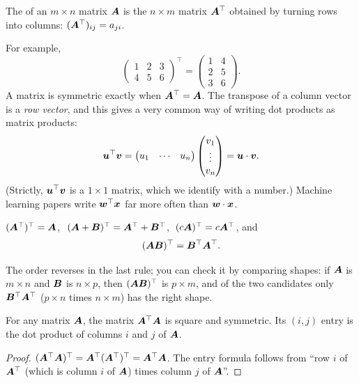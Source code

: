 \begin{definition}[Transpose]\label{def:transpose}
The  of an $m\times n$ matrix $\bm{A}$ is the $n\times m$ matrix
$\bm{A}^\top$ obtained by turning rows into columns: $(\bm{A}^\top)_{ij} = a_{ji}$.
\end{definition}

For example,
\[
  \begin{pmatrix} 1 & 2 & 3\\ 4 & 5 & 6\end{pmatrix}^{\!\top}
  = \begin{pmatrix} 1 & 4\\ 2 & 5\\ 3 & 6\end{pmatrix}.
\]
A matrix is symmetric exactly when $\bm{A}^\top = \bm{A}$. The transpose of a column
vector is a \emph{row vector}, and this gives a very common way of writing dot
products as matrix products:
\[
  \bm{u}^\top\bm{v} = \begin{pmatrix} u_1 & \cdots & u_n\end{pmatrix}
  \begin{pmatrix} v_1\\ \vdots\\ v_n\end{pmatrix} = \bm{u}\cdot\bm{v} .
\]
(Strictly, $\bm{u}^\top\bm{v}$ is a $1\times1$ matrix, which we identify with a
number.) Machine learning papers write $\bm{w}^\top\bm{x}$ far more often than
$\bm{w}\cdot\bm{x}$.

\begin{theorem}\label{thm:transpose-rules}
$(\bm{A}^\top)^\top = \bm{A}$, $\ (\bm{A} + \bm{B})^\top = \bm{A}^\top + \bm{B}^\top$,
$\ (c\bm{A})^\top = c\bm{A}^\top$, and
\[
  (\bm{A}\bm{B})^\top = \bm{B}^\top\bm{A}^\top .
\]
\end{theorem}

The order reverses in the last rule; you can check it by comparing shapes: if
$\bm{A}$ is $m\times n$ and $\bm{B}$ is $n\times p$, then $(\bm{A}\bm{B})^\top$ is
$p\times m$, and of the two candidates only $\bm{B}^\top\bm{A}^\top$ ($p\times n$
times $n\times m$) has the right shape.

\begin{proposition}\label{prop:ata-symmetric}
For any matrix $\bm{A}$, the matrix $\bm{A}^\top\bm{A}$ is square and symmetric. Its
$(i,j)$ entry is the dot product of columns $i$ and $j$ of $\bm{A}$.
\end{proposition}

\begin{proof}
$(\bm{A}^\top\bm{A})^\top = \bm{A}^\top(\bm{A}^\top)^\top = \bm{A}^\top\bm{A}$. The entry formula
follows from ``row $i$ of $\bm{A}^\top$ (which is column $i$ of $\bm{A}$) times column
$j$ of $\bm{A}$''.
\end{proof}

